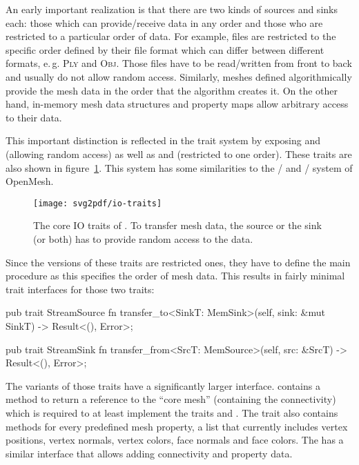 An early important realization is that there are two kinds of sources and sinks each: those which can provide/receive data in any order and those who are restricted to a particular order of data.
For example, files are restricted to the specific order defined by their file format which can differ between different formats, e.\,g. \textsc{Ply} and \textsc{Obj}.
Those files have to be read/written from front to back and usually do not allow random access.
Similarly, meshes defined algorithmically provide the mesh data in the order that the algorithm creates it.
On the other hand, in-memory mesh data structures and property maps allow arbitrary access to their data.

This important distinction is reflected in the trait system by exposing  and  (allowing random access) as well as  and  (restricted to one order).
These traits are also shown in figure~\ref{fig:io-traits}.
This system has some similarities to the / and / system of OpenMesh.

\begin{figure}[t]
  \centering
  \texttt{[image: svg2pdf/io-traits]}
  \caption{
    The core IO traits of .
    To transfer mesh data, the source or the sink (or both) has to provide random access to the
    data.
  }
  \label{fig:io-traits}
\end{figure}

\newpage

Since the  versions of these traits are restricted ones, they have to define the main procedure as this specifies the order of mesh data.
This results in fairly minimal trait interfaces for those two traits:

\begin{rustcode}
  pub trait StreamSource {
      fn transfer_to<SinkT: MemSink>(self, sink: &mut SinkT) -> Result<(), Error>;
  }

  pub trait StreamSink {
      fn transfer_from<SrcT: MemSource>(self, src: &SrcT) -> Result<(), Error>;
  }
\end{rustcode}

The  variants of those traits have a significantly larger interface.
 contains a method to return a reference to the \enquote{core mesh} (containing the connectivity) which is required to at least implement the traits  and .
The trait also contains methods for every predefined mesh property, a list that currently includes vertex positions, vertex normals, vertex colors, face normals and face colors.
The  has a similar interface that allows adding connectivity and property data.


